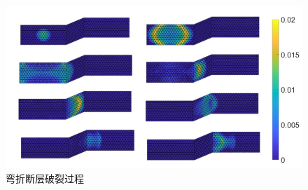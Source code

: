  \begin{figure}[!h]
  \centerin
  \includegraphics[width=0.99\linewidth]{img/rupture2.png}
    \caption{ 弯折断层破裂过程} \label{fig:3d-rupture}
 \end{figure}
 
